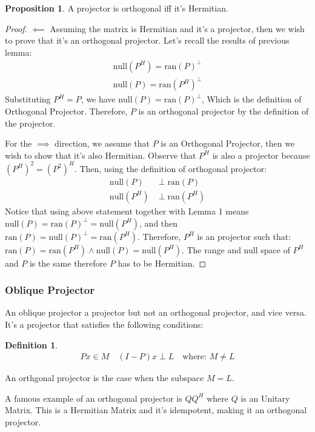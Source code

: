 \documentclass[]{article}
\theoremstyle{definition}
\newtheorem{prop}{Proposition}[section]  %
\newtheorem{definition}{Definition}
\begin{document}
            \begin{prop}
                A projector is orthogonal iff it's Hermitian. 
            \end{prop}
            \begin{proof}
                $\impliedby$ Assuming the matrix is Hermitian and it's a projector, then we wish to prove that it's an orthogonal projector. Let's recall the results of previous lemma: 
                \begin{align}
                    \text{null}(P^H) = \text{ran}(P)^{\perp}
                    \\
                    \text{null}(P) = \text{ran}(P^H)^{\perp}
                \end{align}
                Substituting $P^H = P$, we have $\text{null}(P) = \text{ran}(P)^{\perp}$, Which is the definition of Orthogonal Projector. Therefore, $P$ is an orthogonal projector by the definition of the projector. 
                \par
                For the $\implies$ direction, we assume that $P$ is an Orthogonal Projector, then we wish to show that it's also Hermitian. Observe that $P^H$ is also a projector because $(P^H)^2 = (P^2)^H$. Then, using the definition of orthogonal projector: 
                \begin{align}
                    \text{null}(P) &\perp\text{ran}(P) 
                    \\
                    \text{null}(P^H) &\perp \text{ran}(P^H)
                \end{align}
                Notice that using above statement together with Lemma 1 means $\text{null}(P) = \text{ran}(P)^\perp = \text{null}(P^H)$, and then $\text{ran}(P)=\text{null}(P)^\perp = \text{ran}(P^H)$. Therefore, $P^H$ is an projector such that: $\text{ran}(P) = \text{ran}(P^H) \wedge \text{null}(P) = \text{null}(P^H)$. The range and null space of $P^H$ and $P$ is the same therefore $P$ has to be Hermitian. 
            \end{proof}
            \subsubsection{Oblique Projector}
                An oblique projector a projector but not an orthogonal projector, and vice versa. It's a projector that satisfies the following conditions: 
                \begin{definition}
                    \begin{align}
                        Px \in M \quad (I - P)x \perp L \quad \text{where: } M \neq L
                    \end{align}    
                \end{definition}
                An orthgonal projector is the case when the subspace $M = L$. 
                \par
                A famous example of an orthogonal projector is $QQ^H$ where $Q$ is an Unitary Matrix. This is a Hermitian Matrix and it's idempotent, making it an orthogonal projector. 
\end{document}
